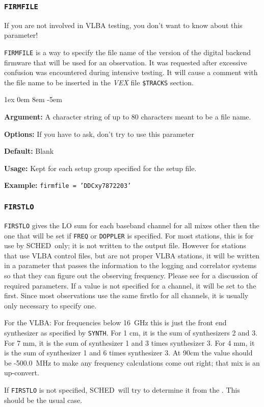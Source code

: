 \documentclass{report}
\newcommand{\schedb}{{\sc SCHED~}}
\newcommand{\rcwbox}[5]{
  \begin{list}{}{\parsep 1ex  \itemsep 0em
                 \leftmargin 8em  \itemindent -5em }
    \item {\bf Argument:} #1
    \item {\bf Options:}  #2
    \item {\bf Default:}  #3
    \item {\bf Usage:}    #4
    \item {\bf Example:}  #5
  \end{list}
}
\begin{document}
\subsubsection{\label{SP:FIRMFILE}{\tt FIRMFILE}}

If you are not involved in VLBA testing, you don't want to know about
this parameter!

{\tt FIRMFILE} is a way to specify the file name of the version of the 
digital backend firmware that will be used for an observation.  It
was requested after excessive confusion was encountered during 
intensive testing.  It will cause a comment with the file name to 
be inserted in the {\sl VEX} file {\tt \$TRACKS} section.

\rcwbox
{A character string of up to 80 characters meant to be a file name.}
{If you have to ask, don't try to use this parameter}
{Blank}
{Kept for each setup group specified for the setup file.}
{{\tt firmfile = 'DDCxy7872203'}}


\subsubsection{\label{SP:FIRSTLO}{\tt FIRSTLO}}

{\tt FIRSTLO} gives the LO sum for each baseband channel for all mixes
other then the one that will be set if {\tt FREQ} or {\tt DOPPLER} is
specified.  For most stations, this is for use by \schedb only; it
is not written to the output file.  However for stations that use VLBA
control files, but are not proper VLBA stations, it will be written in
a parameter that passes the information to the logging and correlator
systems so that they can figure out the observing frequency.  Please
see  for a discussion of required
parameters.  If a value is not specified for a channel, it will be
set to the first.  Since most observations use the same firstlo
for all channels, it is usually only necessary to specify one.

For the VLBA: For frequencies below 16~GHz this is just the front end
synthesizer as specified by {\tt SYNTH}.  For 1 cm, it is the sum of
synthesizers 2 and 3.  For 7 mm, it is the sum of synthesizer 1 and 3
times synthesizer 3.  For 4 mm, it is the sum of synthesizer 1 and 6
times synthesizer 3.  At 90cm the value should be -500.0~MHz to make
any frequency calculations come out right; that mix is an up-convert.

If {\tt FIRSTLO} is not specified, \schedb will try to determine it
from the .  This should be
the usual case.
\end{document}
